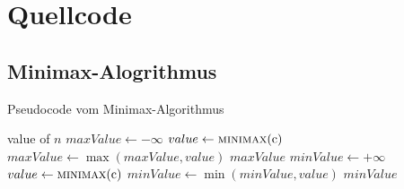 \chapter{Quellcode}
\label{anhang:chapter-quellcode}



\section{Minimax-Alogrithmus}

\begin{algorithm}
    \caption{Pseudocode vom Minimax-Algorithmus}
    \label{algo:minimax}
    \begin{algorithmic}[1]
        \State \Return value of $n$
        \State $maxValue \gets -\infty$
        \State $value \gets \Call{minimax}{$c$}$
        \State $maxValue \gets \max(maxValue, value)$
        \EndFor
        \State \Return $maxValue$
        \State $minValue \gets +\infty$
        \State $value \gets \Call{minimax}{$c$}$
        \State $minValue \gets \min(minValue, value)$
        \EndFor
        \State \Return $minValue$
        \EndIf
        \EndFunction
    \end{algorithmic}
\end{algorithm}